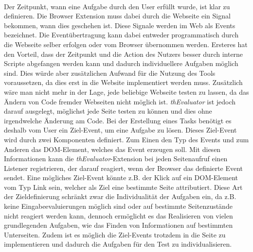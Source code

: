 \\
\label{events}
Der Zeitpunkt, wann eine Aufgabe durch den User erfüllt wurde, ist klar zu definieren. Die Browser Extension muss dabei durch die Webseite ein Signal bekommen, wann dies geschehen ist. Diese Signale werden im Web als Events bezeichnet. Die Eventübertragung kann dabei entweder programmatisch durch die Webseite selber erfolgen oder vom Browser übernommen werden. Ersteres hat den Vorteil, dass der Zeitpunkt und die Action des Nutzers besser durch interne Scripte abgefangen werden kann und dadurch individuellere Aufgaben möglich sind. Dies würde aber zusätzlichen Aufwand für die Nutzung des Tools voraussetzen, da dies erst in die Website implementiert werden muss. Zusätzlich wäre man nicht mehr in der Lage, jede beliebige Webseite testen zu lassen, da das Ändern von Code fremder Webseiten nicht möglich ist. \textit{thEvaluator} ist jedoch darauf ausgelegt, möglichst jede Seite testen zu können und dies ohne irgendwelche Änderung am Code. Bei der Erstellung eines Tasks benötigt es deshalb vom User ein Ziel-Event, um eine Aufgabe zu lösen. Dieses Ziel-Event wird durch zwei Komponenten definiert. Zum Einen den Typ des Events und zum Anderen das \Gls{DOM}-Element, welches das Event erzeugen soll. Mit diesen Informationen kann die \textit{thEvaluator}-Extension bei jeden Seitenaufruf einen Listener registrieren, der darauf reagiert, wenn der Browser das definierte Event sendet. Eine mögliches Ziel-Event könnte z.B. der Klick auf ein \Gls{DOM}-Element vom Typ Link sein, welcher als Ziel eine bestimmte Seite attributiert. Diese Art der Zieldefinierung schränkt zwar die Individualität der Aufgaben ein, da z.B. keine Eingabeevaluierungen möglich sind oder auf bestimmte Seitenzustände nicht reagiert werden kann, dennoch ermöglicht es das Realisieren von vielen grundlegenden Aufgaben, wie das Finden von Informationen auf bestimmten Unterseiten. Zudem ist es möglich die Ziel-Events trotzdem in die Seite zu implementieren und dadurch die Aufgaben für den Test zu individualisieren.